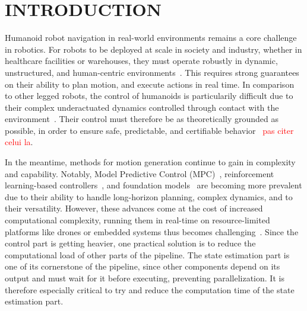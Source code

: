 \documentclass{IJCAS}
\begin{document}




\section{INTRODUCTION}


Humanoid robot navigation in real-world environments remains a core challenge in robotics. For robots to be deployed at scale in society and industry, whether in healthcare facilities or warehouses, they must operate robustly in dynamic, unstructured, and human-centric environments~\cite{Kuindersma2015OptimizationBasedLocomAtlas}. This requires strong guarantees on their ability to plan motion, and execute actions in real time. In comparison to other legged robots, the control of humanoids is particularily difficult due to their complex underactuated dynamics controlled through contact with the environment~\cite{sugihara2020surveyDynamicsHumanoids}. Their control must therefore be as theoretically grounded as possible, in order to ensure safe, predictable, and certifiable behavior~\cite{Weng2022OnSafetyTestingLeggedRobots} \textcolor{red}{pas citer celui la}.

In the meantime, methods for motion generation continue to gain in complexity and capability. Notably, Model Predictive Control (MPC)~\cite{Katayama2023MpcLeggedHumanoid, Dantec2022WholeBodyMPCTorqueControl, Dallard2024AdiosStabilizers}, reinforcement learning-based controllers~\cite{Peters2003ReinforcmentLearningForHumanoid, Li2025RLVersatileDynamicRobustBipedalLocom}, and foundation models~\cite{Bjorck2025GrootN1, kawaharazuka2024RealWorldApplicationsFoundationModels} are becoming more prevalent due to their ability to handle long-horizon planning, complex dynamics, and to their versatility. However, these advances come at the cost of increased computational complexity, running them in real-time on resource-limited platforms like drones or embedded systems thus becomes challenging~\cite{Zeilinger2014RealTimeRobustMPC, findeisen2004computationalDelayNMPC, Thodoroff2022BenchmarkingRealTimeRL, Firoozi2025FoundationModelsInRobotics}. Since the control part is getting heavier, one practical solution is to reduce the computational load of other parts of the pipeline. The state estimation part is one of its cornerstone of the pipeline, since other components depend on its output and must wait for it before executing, preventing parallelization. It is therefore especially critical to try and reduce the computation time of the state estimation part.
\end{document}
